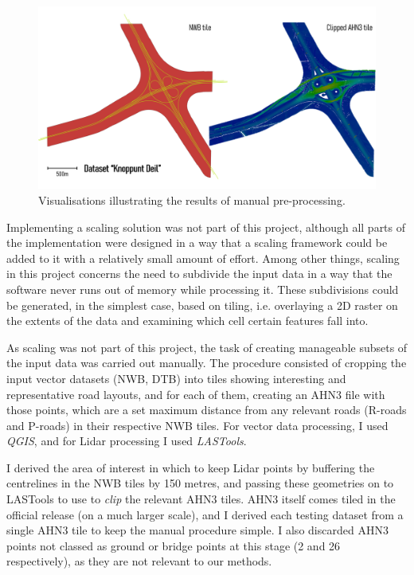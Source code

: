\begin{figure}
    \centering
    \includegraphics[width=\linewidth]{final_report/figs/manualpreprocessing.png}
    \caption{Visualisations illustrating the results of manual pre-processing.}
    \label{fig:manualpreprocessing}
\end{figure}

Implementing a scaling solution was not part of this project, although all parts of the implementation were designed in a way that a scaling framework could be added to it with a relatively small amount of effort. Among other things, scaling in this project concerns the need to subdivide the input data in a way that the software never runs out of memory while processing it. These subdivisions could be generated, in the simplest case, based on tiling, i.e. overlaying a 2D raster on the extents of the data and examining which cell certain features fall into.

As scaling was not part of this project, the task of creating manageable subsets of the input data was carried out manually. The procedure consisted of cropping the input vector datasets (NWB, DTB) into tiles showing interesting and representative road layouts, and for each of them, creating an AHN3 file with those points, which are a set maximum distance from any relevant roads (R-roads and P-roads) in their respective NWB tiles. For vector data processing, I used \textit{QGIS}, and for Lidar processing I used \textit{LASTools}.

I derived the area of interest in which to keep Lidar points by buffering the centrelines in the NWB tiles by 150 metres, and passing these geometries on to LASTools to use to \textit{clip} the relevant AHN3 tiles. AHN3 itself comes tiled in the official release (on a much larger scale), and I derived each testing dataset from a single AHN3 tile to keep the manual procedure simple. I also discarded AHN3 points not classed as ground or bridge points at this stage (2 and 26 respectively), as they are not relevant to our methods.

